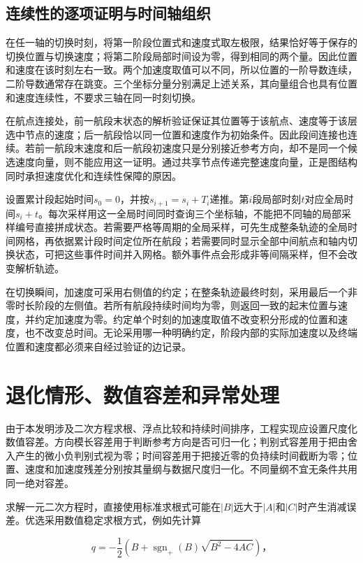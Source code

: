 \documentclass[UTF8,a4paper,12pt,fontset=fandol]{ctexart}
\begin{document}
\subsection{连续性的逐项证明与时间轴组织}

在任一轴的切换时刻，将第一阶段位置式和速度式取左极限，结果恰好等于保存的切换位置与切换速度；将第二阶段局部时间设为零，得到相同的两个量。因此位置和速度在该时刻左右一致。两个加速度取值可以不同，所以位置的一阶导数连续，二阶导数通常存在跳变。三个坐标分量分别满足上述关系，其向量组合也具有位置和速度连续性，不要求三轴在同一时刻切换。

在航点连接处，前一航段末状态的解析验证保证其位置等于该航点、速度等于该层选中节点的速度；后一航段恰以同一位置和速度作为初始条件。因此段间连接也连续。若前一航段末速度和后一航段初速度只是分别接近参考方向，却不是同一个候选速度向量，则不能应用这一证明。通过共享节点传递完整速度向量，正是图结构同时承担速度优化和连续性保障的原因。

设置累计段起始时间\(s_0=0\)，并按\(s_{i+1}=s_i+T_i\)递推。第\(i\)段局部时刻\(t\)对应全局时间\(s_i+t\)。每次采样用这一全局时间同时查询三个坐标轴，不能把不同轴的局部采样编号直接拼成状态。若需要严格等周期的全局采样，可先生成整条轨迹的全局时间网格，再依据累计段时间定位所在航段；若需要同时显示全部中间航点和轴内切换状态，可把这些事件时间并入网格。额外事件点会形成非等间隔采样，但不会改变解析轨迹。

在切换瞬间，加速度可采用右侧值的约定；在整条轨迹最终时刻，采用最后一个非零时长阶段的左侧值。若所有航段持续时间均为零，则返回一致的起末位置与速度，并约定加速度为零。约定单个时刻的加速度取值不改变积分形成的位置和速度，也不改变总时间。无论采用哪一种明确约定，阶段内部的实际加速度以及终端位置和速度都必须来自经过验证的边记录。

\section{退化情形、数值容差和异常处理}

由于本发明涉及二次方程求根、浮点比较和持续时间排序，工程实现应设置尺度化数值容差。方向模长容差用于判断参考方向是否可归一化；判别式容差用于把由舍入产生的微小负判别式视为零；时间容差用于把接近零的负持续时间截断为零；位置、速度和加速度残差分别按其量纲与数据尺度归一化。不同量纲不宜无条件共用同一绝对容差。

求解一元二次方程时，直接使用标准求根式可能在\(|B|\)远大于\(|A|\)和\(|C|\)时产生消减误差。优选采用数值稳定求根方式，例如先计算

\[
q=-\frac12\left(B+\operatorname{sgn}_{+}(B)\sqrt{B^2-4AC}\right)\text{，}
\]
\end{document}
